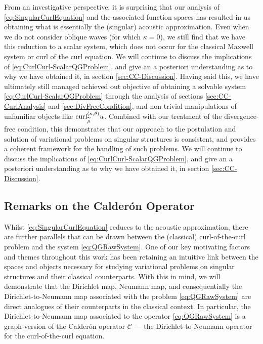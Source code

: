 From an investigative perspective, it is surprising that our analysis of \eqref{eq:SingularCurlEquation} and the associated function spaces has resulted in us obtaining what is essentially the (singular) acoustic approximation.
Even when we do not consider oblique waves (for which $\kappa=0$), we still find that we have this reduction to a scalar system, which does not occur for the classical Maxwell system or curl of the curl equation.
We will continue to discuss the implications of \eqref{eq:CurlCurl-ScalarQGProblem}, and give an a posteriori understanding as to why we have obtained it, in section \ref{sec:CC-Discussion}.
Having said this, we have ultimately still managed achieved out objective of obtaining a solvable system \eqref{eq:CurlCurl-ScalarQGProblem} through the analysis of sections \ref{sec:CC-CurlAnalysis} and \ref{sec:DivFreeCondition}, and non-trivial manipulations of unfamiliar objects like $\mathrm{curl}_{\widetilde{\mu}}^{\left( \kappa, \theta \right)}u$.
Combined with our treatment of the divergence-free condition, this demonstrates that our approach to the postulation and solution of variational problems on singular structures is consistent, and provides a coherent framework for the handling of such problems.
We will continue to discuss the implications of \eqref{eq:CurlCurl-ScalarQGProblem}, and give an a posteriori understanding as to why we have obtained it, in section \ref{sec:CC-Discussion}.

\subsection{Remarks on the Calder\'on Operator} \label{ssec:CalderonOp}
Whilst \eqref{eq:SingularCurlEquation} reduces to the acoustic approximation, there are further parallels that can be drawn between the (classical) curl-of-the-curl problem and the system \eqref{eq:QGRawSystem}.
One of our key motivating factors and themes throughout this work has been retaining an intuitive link between the spaces and objects necessary for studying variational problems on singular structures and their classical counterparts.
With this in mind, we will demonstrate that the Dirichlet map, Neumann map, and consequentially the Dirichlet-to-Neumann map associated with the problem \eqref{eq:QGRawSystem} are direct analogues of their counterparts in the classical context.
In particular, the Dirichlet-to-Neumann map associated to the operator \eqref{eq:QGRawSystem} is a graph-version of the Calder\'{o}n operator $\mathcal{C}$ --- the Dirichlet-to-Neumann operator for the curl-of-the-curl equation.

